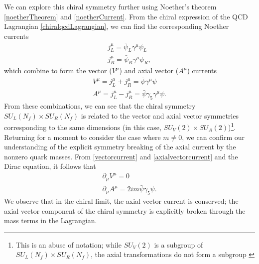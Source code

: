 \documentclass[aps,prd,onecolumn,showpacs,amsmath,amssymb,nofootinbib]{revtex4} \pdfoutput=1
\begin{document}
We can explore this chiral symmetry further using Noether's theorem \eqref{noetherTheorem} and \eqref{noetherCurrent}. From the chiral expression of the QCD Lagrangian \eqref{chiralqcdLagrangian}, we can find the corresponding Noether currents
\begin{gather}
    \label{chiralnoethercurrents}
    j_{L}^{\mu} = \bar{\psi}_{L}\gamma^\mu \psi_{L}\\
    j_{R}^{\mu} = \bar{\psi}_{R}\gamma^\mu \psi_{R},
\end{gather}
which combine to form the vector ($V^\mu$) and axial vector ($A^\mu$) currents 
\begin{gather}
   V^\mu = j_{L}^{\mu} + j_{R}^{\mu} = \bar{\psi} \gamma^{\mu} \psi \label{vectorcurrent}\\
   A^\mu = j_{L}^{\mu} - j_{R}^{\mu} = \bar{\psi} \gamma_{5}\gamma^{\mu} \psi.
   \label{axialvectorcurrent}
\end{gather}
 From these combinations, we can see that the chiral symmetry ${S\!U}_L(N_f)\times {S\!U}_R(N_f)$ is related to the vector and axial vector symmetries corresponding to the same dimensions (in this case, ${S\!U}_V(2)\times {S\!U}_A(2)$)\footnote{This is an abuse of notation; while ${S\!U}_V(2)$ is a subgroup of ${S\!U}_L(N_f)\times {S\!U}_R(N_f)$, the axial transformations do not form a subgroup \cite{Pelaez2011}}. Returning for a moment to consider the case where $m \neq 0$, we can confirm our understanding of the explicit symmetry breaking of the axial current by the nonzero quark masses. From \eqref{vectorcurrent} and \eqref{axialvectorcurrent} and the Dirac equation, it follows that
 \begin{gather}
     \label{vectorcurrentdivergence}
     \partial_\mu V^{\mu} = 0\\
     \label{axialvectorcurrentdivergence}
     \partial_\mu A^{\mu} = 2 i m \bar{\psi} \gamma_{5} \psi .
 \end{gather}
 We observe that in the chiral limit, the axial vector current is conserved; the axial vector component of the chiral symmetry is explicitly broken through the mass terms in the Lagrangian.
\end{document}
